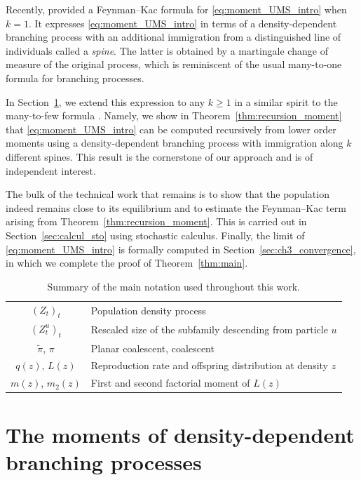 \begin{refsegment}
Recently, \cite{Bansaye} provided a Feynman--Kac formula for
\eqref{eq:moment_UMS_intro} when $k=1$. It expresses
\eqref{eq:moment_UMS_intro} in terms of a density-dependent branching
process with an additional immigration from a distinguished line of
individuals called a \emph{spine}. The latter is obtained by a martingale
change of measure of the original process, which is reminiscent of the
usual many-to-one formula for branching processes.

In Section~\ref{sec:Topology}, we extend this expression to any $k \geqslant 1$
in a similar spirit to the many-to-few formula \citep{Harris_Roberts}.
Namely, we show in Theorem~\ref{thm:recursion_moment} that \eqref{eq:moment_UMS_intro} 
can be computed recursively from lower order moments using a
density-dependent branching process with immigration along $k$ different
spines. This result is the cornerstone of our approach and is of
independent interest.

The bulk of the technical work that remains is to show that the
population indeed remains close to its equilibrium and to estimate the
Feynman--Kac term arising from Theorem~\ref{thm:recursion_moment}. This is
carried out in Section~\ref{sec:calcul_sto} using stochastic calculus. Finally,
the limit of \eqref{eq:moment_UMS_intro} is formally computed in
Section~\ref{sec:ch3_convergence}, in which we complete the proof of
Theorem~\ref{thm:main}.

\begin{table}
\begin{tabular*}{\textwidth}[t]{c|l}
    $(Z_t)_t$ & Population density process \\
    $(Z^{u}_t)_t$ & Rescaled size of the subfamily descending from particle $u$ \\
    $\tilde \pi$, $\pi$ & Planar coalescent, coalescent\\
    $q(z)$, $L(z)$ & Reproduction rate and offspring distribution at density $z$\\
    $m(z)$, $m_2(z)$ & First and second factorial moment of $L(z)$
\end{tabular*}
\caption{Summary of the main notation used throughout this work.}
\end{table}

\section{The moments of density-dependent branching processes}\label{sec:Topology}


\end{refsegment}
